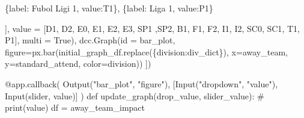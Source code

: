 \documentclass[
  letterpaper,
  DIV=11,
  numbers=noendperiod]{scrartcl}
\newenvironment{Shaded}{\begin{snugshade}}{\end{snugshade}}
\newcommand{\AttributeTok}[1]{\textcolor[rgb]{0.40,0.45,0.13}{#1}}
\newcommand{\BuiltInTok}[1]{\textcolor[rgb]{0.00,0.23,0.31}{#1}}
\newcommand{\CommentTok}[1]{\textcolor[rgb]{0.37,0.37,0.37}{#1}}
\newcommand{\KeywordTok}[1]{\textcolor[rgb]{0.00,0.23,0.31}{#1}}
\newcommand{\NormalTok}[1]{\textcolor[rgb]{0.00,0.23,0.31}{#1}}
\newcommand{\OperatorTok}[1]{\textcolor[rgb]{0.37,0.37,0.37}{#1}}
\newcommand{\StringTok}[1]{\textcolor[rgb]{0.13,0.47,0.30}{#1}}
\newcommand{\VariableTok}[1]{\textcolor[rgb]{0.07,0.07,0.07}{#1}}
\begin{document}
\begin{Shaded}
\begin{Highlighting}[]
\NormalTok{                \{}\StringTok{\textquotesingle{}label\textquotesingle{}}\NormalTok{: }\StringTok{\textquotesingle{}Fubol Ligi 1\textquotesingle{}}\NormalTok{, }\StringTok{\textquotesingle{}value\textquotesingle{}}\NormalTok{:}\StringTok{\textquotesingle{}T1\textquotesingle{}}\NormalTok{\},}
\NormalTok{                \{}\StringTok{\textquotesingle{}label\textquotesingle{}}\NormalTok{: }\StringTok{\textquotesingle{}Liga 1\textquotesingle{}}\NormalTok{, }\StringTok{\textquotesingle{}value\textquotesingle{}}\NormalTok{:}\StringTok{\textquotesingle{}P1\textquotesingle{}}\NormalTok{\}}


\NormalTok{                 ], value }\OperatorTok{=}\NormalTok{ [}\StringTok{\textquotesingle{}D1\textquotesingle{}}\NormalTok{, }\StringTok{\textquotesingle{}D2\textquotesingle{}}\NormalTok{, }\StringTok{\textquotesingle{}E0\textquotesingle{}}\NormalTok{, }\StringTok{\textquotesingle{}E1\textquotesingle{}}\NormalTok{, }\StringTok{\textquotesingle{}E2\textquotesingle{}}\NormalTok{, }\StringTok{\textquotesingle{}E3\textquotesingle{}}\NormalTok{, }\StringTok{\textquotesingle{}SP1\textquotesingle{}}\NormalTok{ ,}\StringTok{\textquotesingle{}SP2\textquotesingle{}}\NormalTok{, }\StringTok{\textquotesingle{}B1\textquotesingle{}}\NormalTok{, }\StringTok{\textquotesingle{}F1\textquotesingle{}}\NormalTok{, }\StringTok{\textquotesingle{}F2\textquotesingle{}}\NormalTok{, }\StringTok{\textquotesingle{}I1\textquotesingle{}}\NormalTok{, }\StringTok{\textquotesingle{}I2\textquotesingle{}}\NormalTok{, }\StringTok{\textquotesingle{}SC0\textquotesingle{}}\NormalTok{, }\StringTok{\textquotesingle{}SC1\textquotesingle{}}\NormalTok{, }\StringTok{\textquotesingle{}T1\textquotesingle{}}\NormalTok{, }\StringTok{\textquotesingle{}P1\textquotesingle{}}\NormalTok{],}
\NormalTok{                 multi }\OperatorTok{=} \VariableTok{True}\NormalTok{),}
\NormalTok{    dcc.Graph(}\BuiltInTok{id} \OperatorTok{=} \StringTok{\textquotesingle{}bar\_plot\textquotesingle{}}\NormalTok{, figure}\OperatorTok{=}\NormalTok{px.bar(initial\_graph\_df.replace(\{}\StringTok{\textquotesingle{}division\textquotesingle{}}\NormalTok{:div\_dict\}), x}\OperatorTok{=}\StringTok{\textquotesingle{}away\_team\textquotesingle{}}\NormalTok{, y}\OperatorTok{=}\StringTok{\textquotesingle{}standard\_attend\textquotesingle{}}\NormalTok{, color}\OperatorTok{=}\StringTok{\textquotesingle{}division\textquotesingle{}}\NormalTok{))}
\NormalTok{])}

\AttributeTok{@app.callback}\NormalTok{(}
\NormalTok{    Output(}\StringTok{"bar\_plot"}\NormalTok{, }\StringTok{"figure"}\NormalTok{), }
\NormalTok{    [Input(}\StringTok{"dropdown"}\NormalTok{, }\StringTok{"value"}\NormalTok{),}
\NormalTok{     Input(}\StringTok{\textquotesingle{}slider\textquotesingle{}}\NormalTok{, }\StringTok{\textquotesingle{}value\textquotesingle{}}\NormalTok{)]}
\NormalTok{    )}
\KeywordTok{def}\NormalTok{ update\_graph(drop\_value, slider\_value):}
    \CommentTok{\# print(value)}
\NormalTok{    df }\OperatorTok{=}\NormalTok{ away\_team\_impact}


\end{Highlighting}
\end{Shaded}
\end{document}
